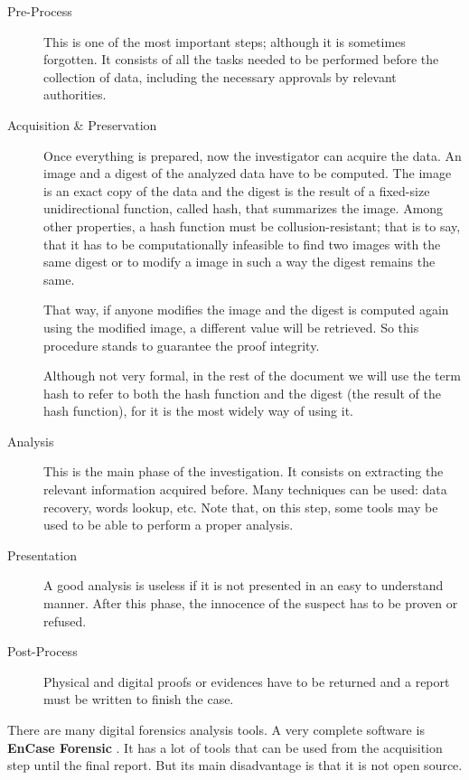 \begin{description}
	\item [Pre-Process]
		This is one of the most important steps; although it is sometimes 
		forgotten. It consists of all the tasks needed to be performed
		before the collection of data, including the necessary approvals 
		by relevant authorities.

	\item [Acquisition \& Preservation]
		Once everything is prepared, now the investigator can acquire 
		the data. An image and a digest of the analyzed data have to be
		computed. The image is an exact copy of the data and the digest is the
		result of a fixed-size unidirectional function, called hash, 
		that summarizes the image. Among other properties, a hash function must
		be collusion-resistant; that is to say, that it has to be
		computationally infeasible to find two images with the same digest or
		to modify a image in such a way the digest remains the same.

		That way, if anyone modifies the image and the digest is computed
		again using the modified image, a different value will be 
		retrieved. So this procedure stands to guarantee the proof 
		integrity.
		
		Although not very formal, in the rest of the document we will use the
		term hash to refer to both the hash function and the digest (the result
		of the hash function), for it is the most widely way of using it.

	\item [Analysis]
		This is the main phase of the investigation. It consists on extracting
		the relevant information acquired before. Many techniques can be 
		used: data recovery, words lookup, etc. Note that, on this step,
		some tools may be used to be able to perform a proper analysis.

	\item [Presentation]
		A good analysis is useless if it is not presented in an easy to 
		understand manner. After this phase, the innocence of the
		suspect has to be proven or refused.

	\item [Post-Process]
		Physical and digital proofs or evidences have to be returned and a
		report must be written to finish the case.

\end{description}

There are many digital forensics analysis tools. A very complete software is 
\textbf{EnCase Forensic} \cite{encase-web}. It has a lot of tools that can be 
used from the acquisition step until the final report. But its main disadvantage
is that it is not open source.

